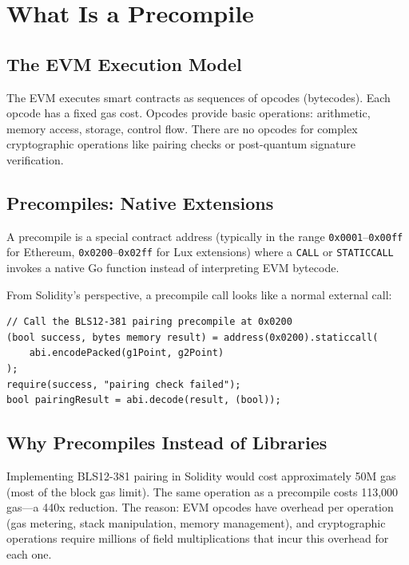 \section{What Is a Precompile}


\subsection{The EVM Execution Model}

The EVM executes smart contracts as sequences of opcodes (bytecodes). Each opcode has a
fixed gas cost. Opcodes provide basic operations: arithmetic, memory access, storage,
control flow. There are no opcodes for complex cryptographic operations like pairing
checks or post-quantum signature verification.

\subsection{Precompiles: Native Extensions}

A precompile is a special contract address (typically in the range \texttt{0x0001}--\texttt{0x00ff}
for Ethereum, \texttt{0x0200}--\texttt{0x02ff} for Lux extensions) where a \texttt{CALL}
or \texttt{STATICCALL} invokes a native Go function instead of interpreting EVM bytecode.

From Solidity's perspective, a precompile call looks like a normal external call:

\begin{lstlisting}[language=Solidity,caption={Calling a precompile from Solidity}]
// Call the BLS12-381 pairing precompile at 0x0200
(bool success, bytes memory result) = address(0x0200).staticcall(
    abi.encodePacked(g1Point, g2Point)
);
require(success, "pairing check failed");
bool pairingResult = abi.decode(result, (bool));
\end{lstlisting}

\subsection{Why Precompiles Instead of Libraries}

Implementing BLS12-381 pairing in Solidity would cost approximately 50M gas (most of the
block gas limit). The same operation as a precompile costs 113,000 gas---a 440x reduction.
The reason: EVM opcodes have overhead per operation (gas metering, stack manipulation,
memory management), and cryptographic operations require millions of field multiplications
that incur this overhead for each one.

